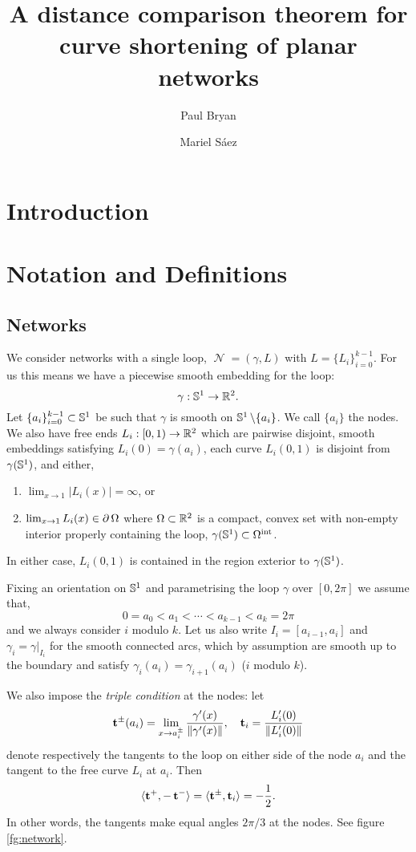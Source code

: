 \documentclass[11pt]{amsart}
\date{}
\author{Paul Bryan}
\author{Mariel S\'aez}
\title{A distance comparison theorem for curve shortening of planar networks}
\DeclareMathOperator{\network}{\mathcal{N}}
\begin{document}
\maketitle

\section{Introduction}
\label{sec:orgheadline1}
\section{Notation and Definitions}
\label{sec:orgheadline5}

\subsection{Networks}
\label{sec:orgheadline2}

We consider networks with a single loop, \(\network = (\gamma, L)\) with \(L = \{L_i\}_{i=0}^{k-1}\). For us this means we have a piecewise smooth embedding for the loop:
\[
\gamma : \mathbb{S}^1 \to \mathbb{R}^2.
\]
Let \(\{a_i\}_{i=0}^{k-1} \subset \mathbb{S}^1\) be such that \(\gamma\) is smooth on \(\mathbb{S}^1 \operatorname{\backslash} \{a_i\}\). We call \(\{a_i\}\) the nodes. We also have free ends \(L_i : [0, 1) \to \mathbb{R}^2\) which are pairwise disjoint, smooth embeddings satisfying \(L_i(0) = \gamma(a_i)\), each curve \(L_i(0, 1)\) is disjoint from \(\gamma(\mathbb{S}^1)\), and either,
\begin{enumerate}
\item \(\lim_{x\to 1} |L_i(x)| = \infty\), or
\item \(\lim_{x\to 1} L_i(x) \in \operatorname{\partial}{\Omega}\) where \(\Omega \subset \mathbb{R}^2\) is a compact, convex set with non-empty interior properly containing the loop, \(\gamma(\mathbb{S}^1) \subset {\Omega}^{\text{int}}\).
\end{enumerate}
In either case, \(L_i(0,1)\) is contained in the region exterior to \(\gamma(\mathbb{S}^1)\).

Fixing an orientation on \(\mathbb{S}^1\) and parametrising the loop \(\gamma\) over \([0, 2\pi]\) we assume that,
\[
0 = a_0 < a_1 < \cdots < a_{k-1} < a_k = 2\pi
\]
and we always consider \(i\) modulo \(k\). Let us also write \(I_i = [a_{i-1}, a_i]\) and \(\gamma_i = \gamma|_{I_i}\) for the smooth connected arcs, which by assumption are smooth up to the boundary and satisfy \(\gamma_i(a_i) = \gamma_{i+1}(a_i)\) (\(i\) modulo \(k\)).

We also impose the \emph{triple condition} at the nodes: let
\[
\operatorname{\mathbf{t}}^{\pm} (a_i) = \lim_{x\to a_i^{\pm}} \frac{\gamma'(x)}{\|\gamma'(x)\|}, \quad \operatorname{\mathbf{t}}_i = \frac{L_i'(0)}{\|L_i'(0)\|}
\]
denote respectively the tangents to the loop on either side of the node \(a_i\) and the tangent to the free curve \(L_i\) at \(a_i\). Then
\begin{equation}
\label{eq:triplecondition}
\langle{\operatorname{\mathbf{t}}^+},{-\operatorname{\mathbf{t}}^-}\rangle = \langle{\operatorname{\mathbf{t}}^{\pm}},{\operatorname{\mathbf{t}}_i}\rangle = - \frac{1}{2}.
\end{equation}
In other words, the tangents make equal angles \(2\pi/3\) at the nodes. See figure \ref{fg:network}.
\end{document}
